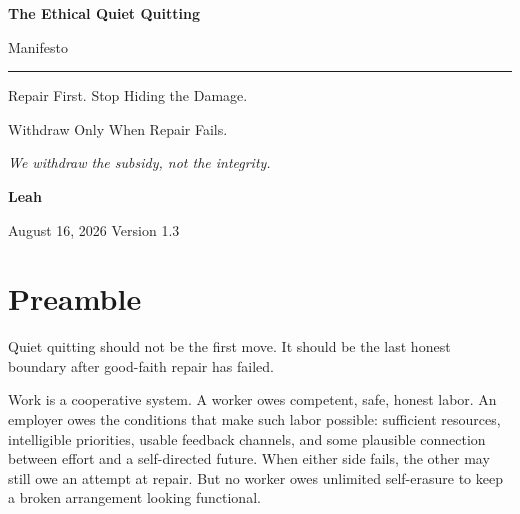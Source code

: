 \documentclass[11pt,oneside]{article}
\begin{document}
\hypersetup{pageanchor=false}

\begin{titlepage}
\thispagestyle{empty}
\vspace*{0.9in}

{\sffamily\bfseries\fontsize{31}{36}\selectfont\color{ManifestInk}
The Ethical Quiet Quitting\par
Manifesto\par}

\vspace{0.5em}
{\color{ManifestRule}\rule{\textwidth}{1.2pt}}
\vspace{1.0em}

{\sffamily\fontsize{17}{23}\selectfont\color{ManifestGray}
Repair First. Stop Hiding the Damage.\par
Withdraw Only When Repair Fails.\par}

\vfill

\begin{tcolorbox}[
  enhanced,
  colback=ManifestLight,
  colframe=ManifestRule,
  boxrule=0pt,
  leftrule=4pt,
  arc=0pt,
  left=14pt,right=14pt,top=13pt,bottom=13pt
]
{\Large\itshape We withdraw the subsidy, not the integrity.}
\end{tcolorbox}

\vfill

{\sffamily\large\bfseries Leah\par}
\vspace{0.2em}
{\sffamily\color{ManifestGray}August 16, 2026 \quad Version 1.3\par}
\vspace{0.55in}
\end{titlepage}

\thispagestyle{plain}
\tableofcontents
\clearpage
{}
\hypersetup{pageanchor=true}

\section{Preamble}\label{preamble}

Quiet quitting should not be the first move. It should be the last
honest boundary after good-faith repair has failed.

Work is a cooperative system. A worker owes competent, safe, honest
labor. An employer owes the conditions that make such labor possible:
sufficient resources, intelligible priorities, usable feedback channels,
and some plausible connection between effort and a self-directed future.
When either side fails, the other may still owe an attempt at repair.
But no worker owes unlimited self-erasure to keep a broken arrangement
looking functional.
\end{document}

